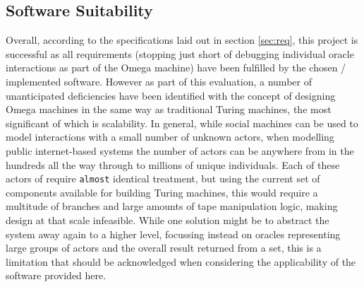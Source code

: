 \documentclass[12pt]{article}
\begin{document}
	\subsection{Software Suitability}
		Overall, according to the specifications laid out in section \ref{sec:req}, this project is successful as all requirements (stopping just short of debugging individual oracle interactions as part of the Omega machine) have been fulfilled by the chosen / implemented software.	
		However as part of this evaluation, a number of unanticipated deficiencies have been identified with the concept of designing Omega machines in the same way as traditional Turing machines, the most significant of which is scalability.
		In general, while social machines can be used to model interactions with a small number of unknown actors, when modelling public internet-based systems the number of actors can be anywhere from in the hundreds all the way through to millions of unique individuals.
		Each of these actors of require \texttt{almost} identical treatment, but using the current set of components available for building Turing machines, this would require a multitude of branches and large amounts of tape manipulation logic, making design at that scale infeasible.
		While one solution might be to abstract the system away again to a higher level, focussing instead on oracles representing large groups of actors and the overall result returned from a set, this is a limitation that should be acknowledged when considering the applicability of the software provided here.
		
\end{document}
